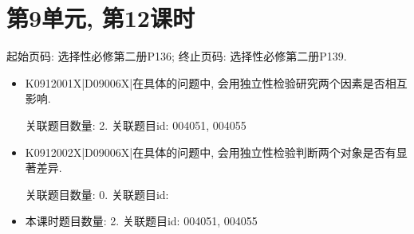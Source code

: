 \section*{第9单元, 第12课时}
起始页码: 选择性必修第二册P136; 终止页码: 选择性必修第二册P139.
\begin{itemize}
\item K0912001X|D09006X|在具体的问题中, 会用独立性检验研究两个因素是否相互影响.

关联题目数量: 2. 关联题目id: 004051, 004055

\item K0912002X|D09006X|在具体的问题中, 会用独立性检验判断两个对象是否有显著差异.

关联题目数量: 0. 关联题目id: 

\item 本课时题目数量: 2. 关联题目id: 004051, 004055

\end{itemize}


